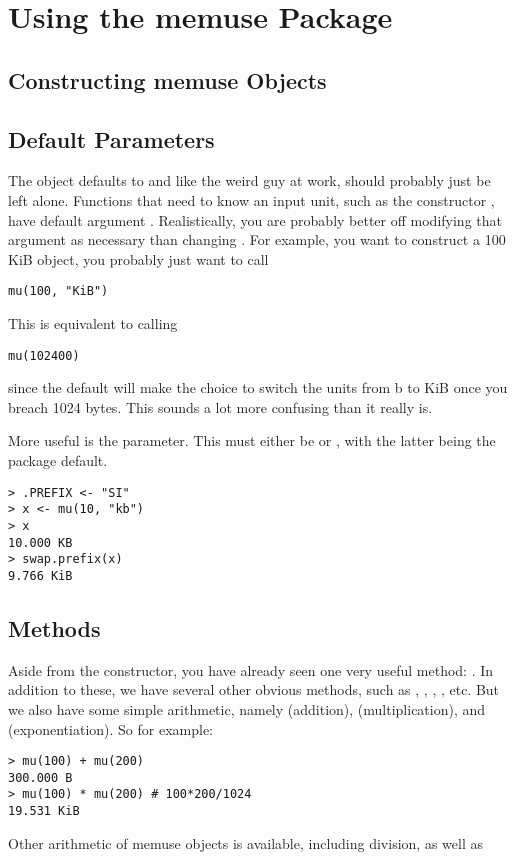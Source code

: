 \section{Using the memuse Package}


\subsection{Constructing memuse Objects}




\subsection{Default Parameters}

The  object defaults to  and like the weird guy at work, should probably just be left alone.  Functions that need to know an input unit, such as the constructor , have default argument .  Realistically, you are probably better off modifying that argument as necessary than changing .  For example, you want to construct a 100 KiB  object, you probably just want to call
\begin{lstlisting}[language=rr]
mu(100, "KiB")
\end{lstlisting}
This is equivalent to calling
\begin{lstlisting}[language=rr]
mu(102400)
\end{lstlisting}
since the default  will make the choice to switch the units from b to KiB once you breach 1024 bytes.  This sounds a lot more confusing than it really is.

More useful is the  parameter.  This must either be  or , with the latter being the package default.  
\begin{lstlisting}[language=rr]
> .PREFIX <- "SI"
> x <- mu(10, "kb")
> x
10.000 KB
> swap.prefix(x)
9.766 KiB
\end{lstlisting}



\subsection{Methods}
Aside from the constructor, you have already seen one very useful method:  .  In addition to these, we have several other obvious methods, such as , , , , etc.  But we also have some simple arithmetic, namely  (addition),  (multiplication), and  (exponentiation).  So for example:
\begin{lstlisting}[language=rr]
> mu(100) + mu(200)
300.000 B
> mu(100) * mu(200) # 100*200/1024
19.531 KiB
\end{lstlisting}
Other arithmetic of memuse objects is available, including division, as well as 

